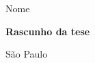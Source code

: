 
\AddToShipoutPicture*{\BackgroundPic}
\thispagestyle{empty}%
\begin{center}
  \vspace*{1.2cm}

  \huge{Nome}

  \vspace{4cm}

  \begin{center}
    \begin{Huge}
      \textbf{Rascunho da tese}
    \end{Huge}
  \end{center}

  \vfill

  \huge{
    São Paulo \\
    \the\year\\
  }
\end{center}

\newpage
\shipout\null %









